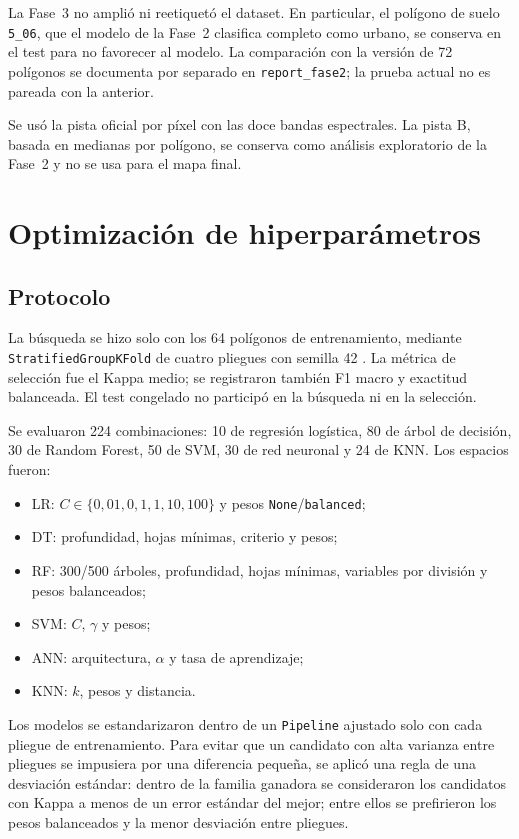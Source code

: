 \documentclass{article}
\begin{document}
La Fase~3 no amplió ni reetiquetó el dataset. En particular, el polígono de suelo \texttt{5\_06}, que el modelo de la Fase~2 clasifica completo como urbano, se conserva en el test para no favorecer al modelo. La comparación con la versión de 72 polígonos se documenta por separado en \texttt{report\_fase2}; la prueba actual no es pareada con la anterior.

Se usó la pista oficial por píxel con las doce bandas espectrales. La pista B, basada en medianas por polígono, se conserva como análisis exploratorio de la Fase~2 y no se usa para el mapa final.

\section{Optimización de hiperparámetros}

\subsection{Protocolo}

La búsqueda se hizo solo con los 64 polígonos de entrenamiento, mediante \texttt{StratifiedGroupKFold} de cuatro pliegues con semilla 42 \parencite{Roberts2017}. La métrica de selección fue el Kappa medio; se registraron también F1 macro y exactitud balanceada. El test congelado no participó en la búsqueda ni en la selección.

Se evaluaron 224 combinaciones: 10 de regresión logística, 80 de árbol de decisión, 30 de Random Forest, 50 de SVM, 30 de red neuronal y 24 de KNN. Los espacios fueron:

\begin{itemize}
 \item LR: $C \in \{0{,}01, 0{,}1, 1, 10, 100\}$ y pesos \texttt{None}/\texttt{balanced};
 \item DT: profundidad, hojas mínimas, criterio y pesos;
 \item RF: 300/500 árboles, profundidad, hojas mínimas, variables por división y pesos balanceados;
 \item SVM: $C$, $\gamma$ y pesos;
 \item ANN: arquitectura, $\alpha$ y tasa de aprendizaje;
 \item KNN: $k$, pesos y distancia.
\end{itemize}

Los modelos se estandarizaron dentro de un \texttt{Pipeline} ajustado solo con cada pliegue de entrenamiento. Para evitar que un candidato con alta varianza entre pliegues se impusiera por una diferencia pequeña, se aplicó una regla de una desviación estándar: dentro de la familia ganadora se consideraron los candidatos con Kappa a menos de un error estándar del mejor; entre ellos se prefirieron los pesos balanceados y la menor desviación entre pliegues.
\end{document}
